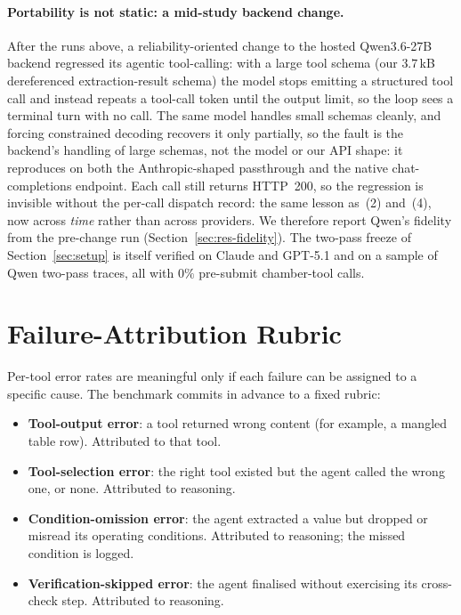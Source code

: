 \documentclass[11pt]{article}
\begin{document}
\paragraph{Portability is not static: a mid-study backend change.}
After the runs above, a reliability-oriented change to the hosted Qwen3.6-27B backend regressed
its agentic tool-calling: with a large tool schema (our $3.7$\,kB
dereferenced extraction-result schema) the model stops emitting a
structured tool call and instead repeats a tool-call token until the
output limit, so the loop sees a terminal turn with no call. The same
model handles small schemas cleanly, and forcing constrained decoding
recovers it only partially, so the fault is the backend's handling of
large schemas, not the model or our API shape: it reproduces on both
the Anthropic-shaped passthrough and the native chat-completions
endpoint. Each call still
returns HTTP~200, so the regression is invisible without the per-call
dispatch record: the same lesson as~(2) and~(4), now across \emph{time}
rather than across providers. We therefore report Qwen's fidelity from
the pre-change run (Section~\ref{sec:res-fidelity}). The two-pass
freeze of Section~\ref{sec:setup} is itself verified on Claude and GPT-5.1 and on a sample of Qwen two-pass
traces, all with $0\%$ pre-submit chamber-tool calls.

\section{Failure-Attribution Rubric}
\label{sec:appendix-rubric}

Per-tool error rates are meaningful only if each failure can be assigned
to a specific cause. The benchmark commits in advance to a fixed rubric:

\begin{itemize}
\item \textbf{Tool-output error}: a tool returned wrong content (for
example, a mangled table row). Attributed to that tool.
\item \textbf{Tool-selection error}: the right tool existed but the
agent called the wrong one, or none. Attributed to reasoning.
\item \textbf{Condition-omission error}: the agent extracted a value but
dropped or misread its operating conditions. Attributed to reasoning;
the missed condition is logged.
\item \textbf{Verification-skipped error}: the agent finalised without
exercising its cross-check step. Attributed to reasoning.
\end{itemize}
\end{document}
